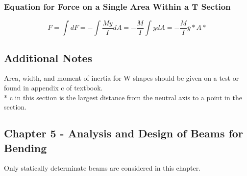\documentclass[10pt,landscape]{article}
\begin{document}
\begin{multicols}{3}
\subsubsection{Equation for Force on a Single Area Within a T Section}
\begin{equation}
    F=\int dF=-\int\frac{My}{I}dA=-\frac{M}{I}\int ydA=-\frac{M}{I}\bar{y}*A*
\end{equation}
\subsection{Additional Notes}
Area, width, and moment of inertia for W shapes should be given on a test or found in appendix c of textbook.\\*
c in this section is the largest distance from the neutral axis to a point in the section.

\subsection{Chapter 5 - Analysis and Design of Beams for Bending}
Only statically determinate beams are considered in this chapter.

\end{multicols}
\end{document}
